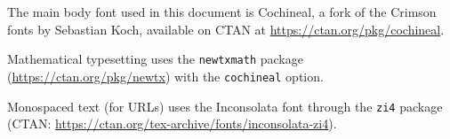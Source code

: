 \vfill

{
	\footnotesize
	The main body font used in this document is Cochineal, a fork of the Crimson fonts by Sebastian Koch, available on CTAN at \url{https://ctan.org/pkg/cochineal}.

	Mathematical typesetting uses the \texttt{newtxmath} package (\url{https://ctan.org/pkg/newtx}) with the \texttt{cochineal} option.

	Monospaced text (for URLs) uses the Inconsolata font through the \texttt{zi4} package\\
	(CTAN: \url{https://ctan.org/tex-archive/fonts/inconsolata-zi4}).

}
